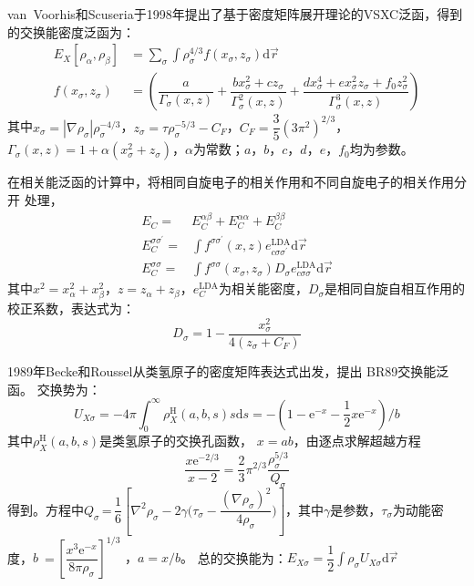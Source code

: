 van~Voorhis和Scuseria于1998年提出了基于密度矩阵展开理论的VSXC泛函，得到的交换能密度泛函为：
\begin{equation}
  \begin{aligned}
    E_X[\rho_{\alpha},\rho_{\beta}]&=\sum_{\sigma}\int\rho_{\sigma}^{4/3}{f(x_{\sigma},z_{\sigma})
    }\textrm{d}\vec r\\
    f(x_{\sigma},z_{\sigma})&=\left(\dfrac a{\Gamma_{\sigma}(x,z)}+\dfrac{bx_{\sigma}^2+cz_{\sigma}}{\Gamma_{\sigma}^2(x,z)}+\dfrac{dx_{\sigma}^4+ex_{\sigma}^2z_{\sigma}+f_0z_{\sigma}^2}{\Gamma_{\sigma}^3(x,z)}\right) 
  \end{aligned}
  \label{ed:def-22}
\end{equation}
其中$x_{\sigma}=|\nabla\rho_{\sigma}|\rho_{\sigma}^{-4/3}$，$z_{\sigma}=\tau\rho_{\sigma}^{-5/3}-C_F$，$C_F=\dfrac35(3\pi^2)^{2/3}$，$\Gamma_{\sigma}(x,z)=1+\alpha(x_{\sigma}^2+z_{\sigma})$，\linebreak $\alpha$为常数；$a$，$b$，$c$，$d$，$e$，$f_0$均为参数。

{在}相关能泛函的计算中，将相同自旋电子的相关作用和不同自旋{电子}的相关作用分开%
{处理}，%
\begin{equation}
  \begin{aligned}
    E_C=&E_C^{\alpha\beta}+E_C^{\alpha\alpha}+E_C^{\beta\beta}\\
    E_C^{\sigma\sigma^{\prime}}=&\int f^{\sigma\sigma^{\prime}}(x,z)e_{c\sigma\sigma^{\prime}}^{\mathrm{LDA}}\textrm{d}\vec r\\
    E_C^{\sigma\sigma}=&\int f^{\sigma\sigma}(x_{\sigma},z_{\sigma})
    D_{\sigma}e_{c\sigma\sigma}^{\mathrm{LDA}}\textrm{d}\vec r
  \end{aligned}
  \label{eq:dft-23}
\end{equation}
其中$x^2=x_{\alpha}^2+x_{\beta}^2$，$z=z_{\alpha}+z_{\beta}$，{$e_C^{\mathrm{LDA}}$为相关能密度，}$D_{\sigma}$是相同自旋自相互作用的校正系数，表达式为：
$$D_{\sigma}=1-\dfrac{x_{\sigma}^2}{4(z_{\sigma}+C_F)}$$

1989年Becke和Roussel从类氢原子的密度矩阵表达式出发，提出%
BR89交换能泛函。
交换势为：
$$U_{X\sigma}=-4\pi\int_0^{\infty}\rho_X^{\mathrm{H}}(a,b,s)s\textrm{d}s=-\left(1-\textrm{e}^{-x}-\frac12x\textrm{e}^{-x}\right)/b$$
其中$\rho_X^{\mathrm{H}}(a,b,s)$是类氢原子的交换孔函数，%
{$x=ab$}，由{逐点求解}超越方程
$$\dfrac{x\textrm{e}^{-2/3}}{x-2}=\dfrac23\pi^{2/3}\dfrac{\rho_{\sigma}^{5/3}}{Q_{\sigma}}$$
得到。方程中$Q_{\sigma}$\,=\,$\dfrac16\left[\nabla^2\rho_{\sigma}-2\gamma\bigl(\tau_{\sigma}-\dfrac{(\nabla\rho_{\sigma})^2}{4\rho_{\sigma}}\bigr)\right]$，其中$\gamma$是参数，$\tau_{\sigma}$为动能密度{，}\linebreak $b$%
\,=\,$\left[\dfrac{x^3\textrm{e}^{-x}}{8\pi\rho_{\sigma}}\right]^{1/3}$%
{，$a=x/b$。}%
总的交换能为：$E_{X\sigma}=\dfrac12\displaystyle\int\rho_{\sigma}U_{X\sigma}\textrm{d}\vec r$

